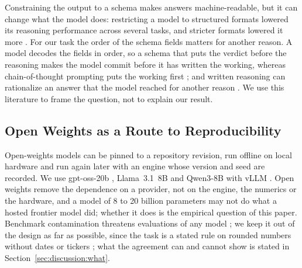 Constraining the output to a schema makes answers machine-readable, but it can change what the model does: restricting a model to structured formats lowered its reasoning performance across several tasks, and stricter formats lowered it more \cite{tam2024format}. For our task the order of the schema fields matters for another reason. A model decodes the fields in order, so a schema that puts the verdict before the reasoning makes the model commit before it has written the working, whereas chain-of-thought prompting puts the working first \cite{wei2022chain}; and written reasoning can rationalize an answer that the model reached for another reason \cite{turpin2023unfaithful}. We use this literature to frame the question, not to explain our result.

\subsection{Open Weights as a Route to Reproducibility}
\label{sec:background:open}

Open-weights models can be pinned to a repository revision, run offline on local hardware and run again later with an engine whose version and seed are recorded. We use gpt-oss-20b \cite{openai2025gptoss}, Llama~3.1~8B \cite{grattafiori2024llama3} and Qwen3-8B \cite{yang2025qwen3} with vLLM \cite{kwon2023vllm}. Open weights remove the dependence on a provider, not on the engine, the numerics or the hardware, and a model of 8 to 20 billion parameters may not do what a hosted frontier model did; whether it does is the empirical question of this paper. Benchmark contamination threatens evaluations of any model \cite{dong2024generalization}; we keep it out of the design as far as possible, since the task is a stated rule on rounded numbers without dates or tickers \cite{regan2025obfuscation}; what the agreement can and cannot show is stated in Section~\ref{sec:discussion:what}.
